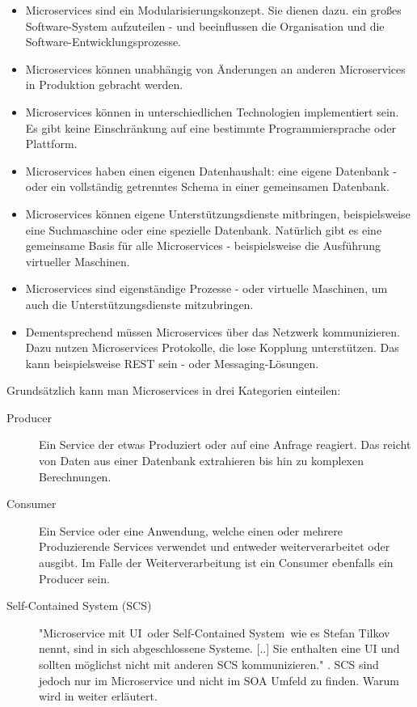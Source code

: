 \begin{itemize}
    \item Microservices sind ein Modularisierungskonzept. Sie dienen dazu. ein großes Software-System aufzuteilen - und beeinflussen die Organisation und die Software-Entwicklungsprozesse.
    \item Microservices können unabhängig von Änderungen an anderen Microservices in Produktion gebracht werden.
    \item Microservices können in unterschiedlichen Technologien implementiert sein. Es gibt keine Einschränkung auf eine bestimmte Programmiersprache oder Plattform.
    \item Microservices haben einen eigenen Datenhaushalt: eine eigene Datenbank - oder ein vollständig getrenntes Schema in einer gemeinsamen Datenbank.
    \item Microservices können eigene Unterstützungsdienste mitbringen, beispielsweise eine Suchmaschine oder eine spezielle Datenbank. Natürlich gibt es eine gemeinsame Basis für alle Microservices - beispielsweise die Ausführung virtueller Maschinen.
    \item Microservices sind eigenständige Prozesse - oder virtuelle Maschinen, um auch die Unterstützungsdienste mitzubringen.
    \item Dementsprechend müssen Microservices über das Netzwerk kommunizieren. Dazu nutzen Microservices Protokolle, die lose Kopplung unterstützen. Das kann beispielsweise REST sein - oder Messaging-Lösungen.
\end{itemize}

Grundsätzlich kann man Microservices in drei Kategorien einteilen:
\begin{description}
    \item[Producer] Ein Service der etwas Produziert oder auf eine Anfrage reagiert. Das reicht von Daten aus einer Datenbank extrahieren bis hin zu komplexen Berechnungen.
    \item[Consumer] Ein Service oder eine Anwendung, welche einen oder mehrere Produzierende Services verwendet und entweder weiterverarbeitet oder ausgibt. Im Falle der Weiterverarbeitung ist ein Consumer ebenfalls ein Producer sein.
    \item[Self-Contained System (SCS)] "\frqq Microservice mit UI\flqq\ oder \frqq Self-Contained System\flqq\ wie es Stefan Tilkov nennt, sind in sich abgeschlossene Systeme. [..] Sie enthalten eine UI und sollten möglichst nicht mit anderen SCS kommunizieren." \cite[vgl S. 55]{EWolff2016:Microservices}. SCS sind jedoch nur im Microservice und nicht im SOA Umfeld zu finden. Warum wird in  weiter erläutert.
\end{description}

